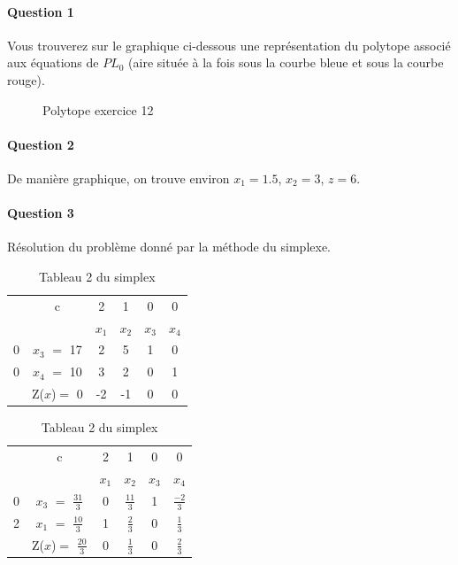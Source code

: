 \paragraph{Question 1}

Vous trouverez sur le graphique ci-dessous une représentation du
polytope associé aux équations de $PL_0$ (aire située à la fois sous la courbe
bleue et sous la courbe rouge).

\begin{figure}[h!]
\centering
{}
\caption{Polytope exercice 12}
\end{figure}

\paragraph{Question 2}
De manière graphique, on trouve environ $x_1 = 1.5$, $x_2 = 3$, $z = 6$.

\paragraph{Question 3}

Résolution du problème donné par la méthode du simplexe.

\begin{table}[h!]	
\centering
	\begin{tabular}{|c|c|c|c|c|c|}
	\hline
      & c & 2 & 1 & 0 & 0 \\ 
      \cline{2-6}
       &  & $x_{1}$ & $x_{2}$  & $x_{3}$  & $x_{4}$ \\
       \hline
   0 & $x_{3}$  $=$ 17 & 2 & 5 & 1 & 0 \\
      \hline
	0 & $x_{4}$ $=$ 10  & 3 & 2 & 0 & 1 \\
	  \hline
	 & Z($x$)$=$ 0 & -2 & -1 & 0 & 0\\
	  \hline
	\end{tabular}
\caption {Tableau 1 du simplex}	
\centering
	\begin{tabular}{|c|c|c|c|c|c|}
	\hline
      & c & 2 & 1 & 0 & 0 \\ 
      \cline{2-6}
       &  & $x_{1}$ & $x_{2}$  & $x_{3}$  & $x_{4}$ \\
       \hline
   0 & $x_{3}$  $=$ $\frac{31}{3}$ & 0 & $\frac{11}{3}$ & 1 & $\frac{-2}{3}$ \\
      \hline
	2 & $x_{1}$ $=$ $\frac{10}{3}$  & 1 & $\frac{2}{3}$ & 0 & $\frac{1}{3}$ \\
	  \hline
	 & Z($x$)$=$ $\frac{20}{3}$ & 0 & $\frac{1}{3}$ & 0 & $\frac{2}{3}$\\
	  \hline
	\end{tabular}
\caption {Tableau 2 du simplex}
\end{table}



